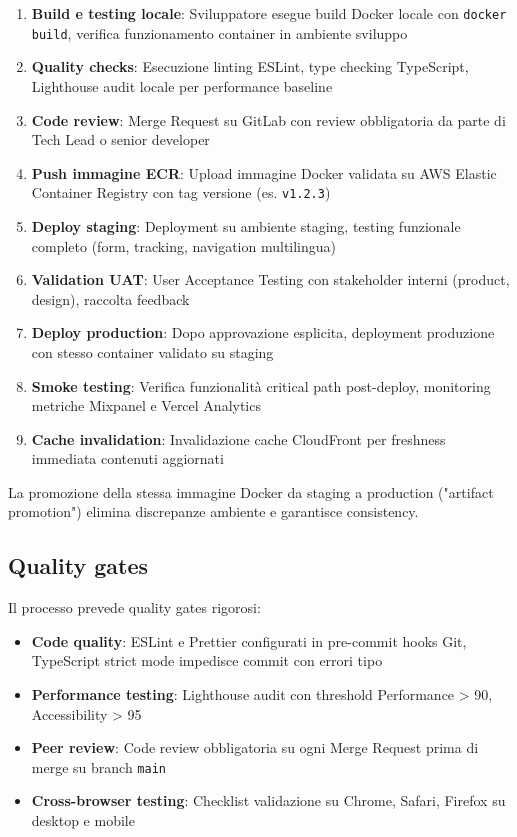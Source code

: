 \begin{enumerate}
  \item \textbf{Build e testing locale}: Sviluppatore esegue build Docker locale con \texttt{docker build}, verifica funzionamento container in ambiente sviluppo
  
  \item \textbf{Quality checks}: Esecuzione linting ESLint, type checking TypeScript, Lighthouse audit locale per performance baseline
  
  \item \textbf{Code review}: Merge Request su GitLab con review obbligatoria da parte di Tech Lead o senior developer
  
  \item \textbf{Push immagine ECR}: Upload immagine Docker validata su AWS Elastic Container Registry con tag versione (es. \texttt{v1.2.3})
  
  \item \textbf{Deploy staging}: Deployment su ambiente staging, testing funzionale completo (form, tracking, navigation multilingua)
  
  \item \textbf{Validation UAT}: User Acceptance Testing con stakeholder interni (product, design), raccolta feedback
  
  \item \textbf{Deploy production}: Dopo approvazione esplicita, deployment produzione con stesso container validato su staging
  
  \item \textbf{Smoke testing}: Verifica funzionalità critical path post-deploy, monitoring metriche Mixpanel e Vercel Analytics
  
  \item \textbf{Cache invalidation}: Invalidazione cache CloudFront per freshness immediata contenuti aggiornati
\end{enumerate}

La promozione della stessa immagine Docker da staging a production ("artifact promotion") elimina discrepanze ambiente e garantisce consistency.

\subsection{Quality gates}

Il processo prevede quality gates rigorosi:

\begin{itemize}
  \item \textbf{Code quality}: ESLint e Prettier configurati in pre-commit hooks Git, TypeScript strict mode impedisce commit con errori tipo
  \item \textbf{Performance testing}: Lighthouse audit con threshold Performance > 90, Accessibility > 95
  \item \textbf{Peer review}: Code review obbligatoria su ogni Merge Request prima di merge su branch \texttt{main}
  \item \textbf{Cross-browser testing}: Checklist validazione su Chrome, Safari, Firefox su desktop e mobile
\end{itemize}

